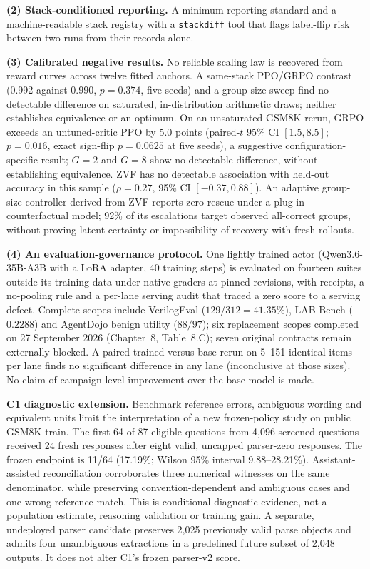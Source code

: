 \documentclass[12pt,a4paper]{report}
\begin{document}
\textbf{(2) Stack-conditioned reporting.} A minimum reporting standard and a
machine-readable stack registry with a \texttt{stackdiff} tool that flags
label-flip risk between two runs from their records alone.

\textbf{(3) Calibrated negative results.} No reliable scaling law is recovered
from reward curves across twelve fitted anchors. A same-stack PPO/GRPO
contrast (0.992 against 0.990, $p = 0.374$, five seeds) and a group-size sweep
find no detectable difference on saturated, in-distribution arithmetic draws;
neither establishes equivalence or an optimum. On an unsaturated GSM8K rerun, GRPO exceeds an
untuned-critic PPO by 5.0 points (paired-$t$ 95\% CI $[1.5, 8.5]$;
$p=0.016$, exact sign-flip $p=0.0625$ at five seeds), a suggestive
configuration-specific result; $G = 2$ and $G = 8$ show no detectable
difference, without establishing equivalence. ZVF has no detectable
association with held-out accuracy in this sample
($\rho = 0.27$, 95\% CI $[-0.37, 0.88]$). An adaptive group-size controller
derived from ZVF reports zero rescue under a plug-in counterfactual model;
92\% of its escalations target observed all-correct groups, without proving
latent certainty or impossibility of recovery with fresh rollouts.

\textbf{(4) An evaluation-governance protocol.} One lightly trained actor
(Qwen3.6-35B-A3B with a LoRA adapter, 40 training steps) is evaluated on
fourteen suites outside its training data under native graders at pinned revisions, with
receipts, a no-pooling rule and a per-lane serving audit that traced a
zero score to a serving defect. Complete scopes include VerilogEval
($129/312 = 41.35\%$), LAB-Bench ($0.2288$) and AgentDojo benign utility
($88/97$); six replacement scopes completed on 27 September 2026
(Chapter~8, Table~8.C); seven original contracts remain externally blocked. A
paired trained-versus-base rerun on 5--151 identical items per lane finds no
significant difference in any lane (inconclusive at those sizes). No
claim of campaign-level improvement over the base model is made.


\textbf{C1 diagnostic extension.} Benchmark reference errors, ambiguous wording and equivalent units limit the interpretation of a new frozen-policy study on public GSM8K train. The first 64 of 87 eligible questions from 4,096 screened questions received 24 fresh responses after eight valid, uncapped parser-zero responses. The frozen endpoint is 11/64 (17.19\%; Wilson 95\% interval 9.88--28.21\%). Assistant-assisted reconciliation corroborates three numerical witnesses on the same denominator, while preserving convention-dependent and ambiguous cases and one wrong-reference match. This is conditional diagnostic evidence, not a population estimate, reasoning validation or training gain. A separate, undeployed parser candidate preserves 2,025 previously valid parse objects and admits four unambiguous extractions in a predefined future subset of 2,048 outputs. It does not alter C1's frozen parser-v2 score.
\end{document}
